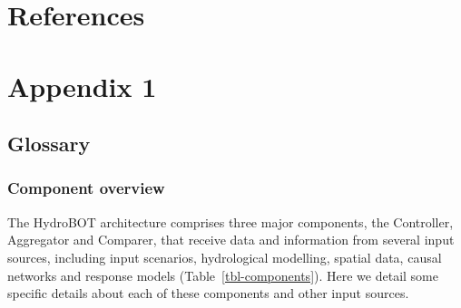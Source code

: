 \documentclass[
  number]{elsarticle}
\begin{document}
\hypertarget{references}{%
\section{References}\label{references}}

\renewcommand{\bibsection}{}


\hypertarget{appendix-1}{%
\section{Appendix 1}\label{appendix-1}}

\hypertarget{sec-sec-glossary}{%
\subsection{Glossary}\label{sec-sec-glossary}}

\hypertarget{component-overview}{%
\subsubsection{Component overview}\label{component-overview}}

The HydroBOT architecture comprises three major components, the
Controller, Aggregator and Comparer, that receive data and information
from several input sources, including input scenarios, hydrological
modelling, spatial data, causal networks and response models
(Table~\ref{tbl-components}). Here we detail some specific details about
each of these components and other input sources.
\end{document}
